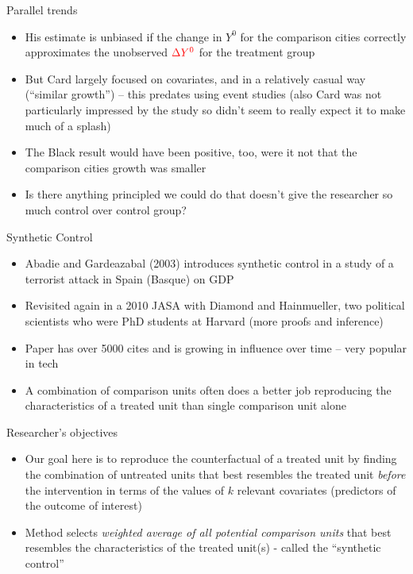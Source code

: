 \documentclass{beamer}
\begin{document}
\begin{frame}{Parallel trends}

\begin{itemize}
\item His estimate is unbiased if the change in $Y^0$ for the comparison cities correctly approximates the unobserved $\textcolor{red}{\Delta Y^0}$ for the treatment group
\item But Card largely focused on covariates, and in a relatively casual way (``similar growth'') -- this predates using event studies (also Card was not particularly impressed by the study so didn't seem to really expect it to make much of a splash)
\item The Black result would have been positive, too, were it not that the comparison cities growth was smaller
\item Is there anything principled we could do that doesn't give the researcher so much control over control group?
\end{itemize}

\end{frame}


\begin{frame}{Synthetic Control}
	
	\begin{itemize}
	\item Abadie and Gardeazabal (2003) introduces synthetic control in a study of a terrorist attack in Spain (Basque) on GDP
	\item Revisited again in a 2010 JASA with Diamond and Hainmueller, two political scientists who were PhD students at Harvard (more proofs and inference)
	\item Paper has over 5000 cites and is growing in influence over time -- very popular in tech
	\item A combination of comparison units often does a better job reproducing the characteristics of a treated unit than single comparison unit alone
	\end{itemize}
\end{frame}


\begin{frame}{Researcher's objectives}

\begin{itemize}
	\item Our goal here is to reproduce the counterfactual of a treated unit by finding the combination of untreated units that best resembles the treated unit \emph{before} the intervention in terms of the values of $k$ relevant covariates (predictors of the outcome of interest)
	\item Method selects \emph{weighted average of all potential comparison units} that best resembles the characteristics of the treated unit(s) - called the ``synthetic control''
\end{itemize}

\end{frame}
\end{document}
